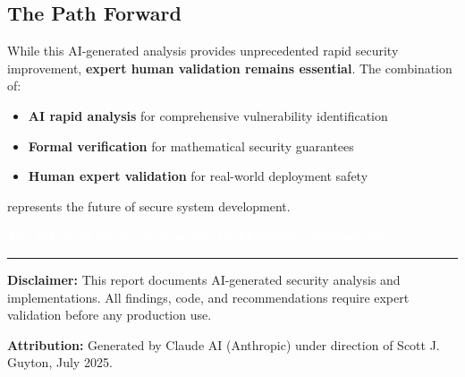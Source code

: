 \documentclass[11pt,a4paper]{article}
\begin{document}
\subsection{The Path Forward}

While this AI-generated analysis provides unprecedented rapid security improvement, \textbf{expert human validation remains essential}. The combination of:

\begin{itemize}
    \item \textbf{AI rapid analysis} for comprehensive vulnerability identification
    \item \textbf{Formal verification} for mathematical security guarantees
    \item \textbf{Human expert validation} for real-world deployment safety
\end{itemize}

represents the future of secure system development.

\begin{center}
\colorbox{successgreen}{\textcolor{white}{\textbf{The future of secure systems lies in AI-human collaboration}}}
\end{center}

\vspace{2cm}

\hrule

\vspace{0.5cm}

\textbf{Disclaimer:} This report documents AI-generated security analysis and implementations. All findings, code, and recommendations require expert validation before any production use.

\textbf{Attribution:} Generated by Claude AI (Anthropic) under direction of Scott J. Guyton, July 2025.
\end{document}
